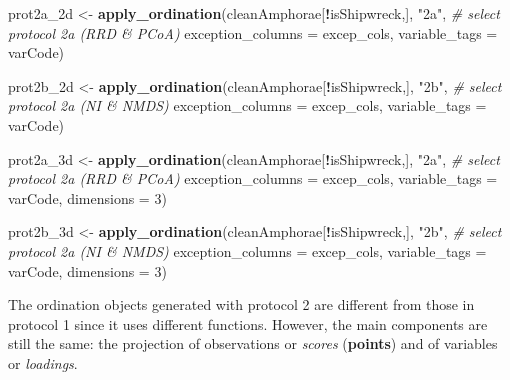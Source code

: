 \documentclass[12pt,]{book}
\newenvironment{Shaded}{\begin{snugshade}}{\end{snugshade}}
\newcommand{\CommentTok}[1]{\textcolor[rgb]{0.56,0.35,0.01}{\textit{#1}}}
\newcommand{\DataTypeTok}[1]{\textcolor[rgb]{0.13,0.29,0.53}{#1}}
\newcommand{\DecValTok}[1]{\textcolor[rgb]{0.00,0.00,0.81}{#1}}
\newcommand{\KeywordTok}[1]{\textcolor[rgb]{0.13,0.29,0.53}{\textbf{#1}}}
\newcommand{\NormalTok}[1]{#1}
\newcommand{\OperatorTok}[1]{\textcolor[rgb]{0.81,0.36,0.00}{\textbf{#1}}}
\newcommand{\StringTok}[1]{\textcolor[rgb]{0.31,0.60,0.02}{#1}}
\begin{document}
\begin{Shaded}
\begin{Highlighting}[]
\NormalTok{prot2a_2d <-}\StringTok{ }\KeywordTok{apply_ordination}\NormalTok{(cleanAmphorae[}\OperatorTok{!}\NormalTok{isShipwreck,],}
                              \StringTok{"2a"}\NormalTok{, }\CommentTok{# select protocol 2a (RRD & PCoA)}
                              \DataTypeTok{exception_columns =}\NormalTok{ excep_cols,}
                              \DataTypeTok{variable_tags =}\NormalTok{ varCode)}

\NormalTok{prot2b_2d <-}\StringTok{ }\KeywordTok{apply_ordination}\NormalTok{(cleanAmphorae[}\OperatorTok{!}\NormalTok{isShipwreck,],}
                              \StringTok{"2b"}\NormalTok{, }\CommentTok{# select protocol 2a (NI & NMDS)}
                              \DataTypeTok{exception_columns =}\NormalTok{ excep_cols,}
                              \DataTypeTok{variable_tags =}\NormalTok{ varCode)}

\NormalTok{prot2a_3d <-}\StringTok{ }\KeywordTok{apply_ordination}\NormalTok{(cleanAmphorae[}\OperatorTok{!}\NormalTok{isShipwreck,],}
                              \StringTok{"2a"}\NormalTok{, }\CommentTok{# select protocol 2a (RRD & PCoA)}
                              \DataTypeTok{exception_columns =}\NormalTok{ excep_cols,}
                              \DataTypeTok{variable_tags =}\NormalTok{ varCode,}
                              \DataTypeTok{dimensions =} \DecValTok{3}\NormalTok{)}

\NormalTok{prot2b_3d <-}\StringTok{ }\KeywordTok{apply_ordination}\NormalTok{(cleanAmphorae[}\OperatorTok{!}\NormalTok{isShipwreck,],}
                              \StringTok{"2b"}\NormalTok{, }\CommentTok{# select protocol 2a (NI & NMDS)}
                              \DataTypeTok{exception_columns =}\NormalTok{ excep_cols,}
                              \DataTypeTok{variable_tags =}\NormalTok{ varCode,}
                              \DataTypeTok{dimensions =} \DecValTok{3}\NormalTok{)}
\end{Highlighting}
\end{Shaded}

\pagebreak

The ordination objects generated with protocol 2 are different from those in protocol 1 since it uses different functions. However, the main components are still the same: the projection of observations or \emph{scores} (\textbf{points}) and of variables or \emph{loadings}.
\end{document}
